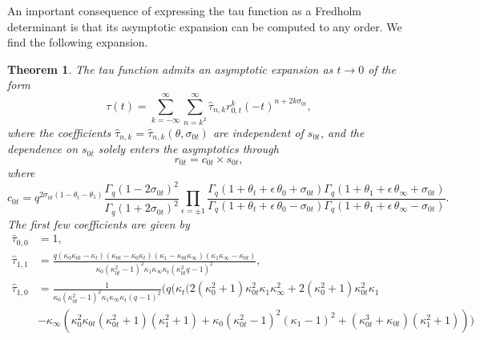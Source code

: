 \documentclass[a4paper,reqno,11pt]{amsart}
\numberwithin{equation}{section}
\numberwithin{figure}{section}
\theoremstyle{plain}
\newtheorem{theorem}{Theorem}[section]
\theoremstyle{remark}
\numberwithin{rhp}{section}
\begin{document}
An important consequence of expressing the tau function as a Fredholm determinant is that its asymptotic expansion can be computed to any order. We find the following expansion.
\begin{theorem}\label{thm:tau-asymp}
    The tau function admits an asymptotic expansion as $t\rightarrow 0$ of the form
\begin{equation}\label{eq:tau-asymp}
    \tau(t)=\sum_{k=-\infty}^\infty\sum_{n=k^2}^\infty \widehat{\tau}_{n,k} r_{0,t}^{k} (-t)^{n+ 2k \sigma_{0t}},
\end{equation}
where the coefficients $\widehat{\tau}_{n,k}=\widehat{\tau}_{n,k}(\theta,\sigma_{0t})$ are independent of $s_{0t}$, and the dependence on $s_{0t}$ solely enters the asymptotics through
\begin{equation}
    r_{0t}=c_{0t}\times s_{0t}, \label{rcs}
\end{equation}
where
\begin{equation}\label{eq:def_c0t}
c_{0t}=q^{2\sigma_{0t}(1-\theta_t-\theta_1)}\frac{\Gamma_q(1-2\sigma_{0t})^2}{\Gamma_q(1+2\sigma_{0t})^2}\prod_{\epsilon=\pm1}\frac{ \Gamma_q(1+\theta_t+\epsilon\,\theta_0+\sigma_{0t})  \Gamma_q(1+\theta_1+\epsilon\,\theta_\infty+\sigma_{0t})}{ \Gamma_q(1+\theta_t+\epsilon\,\theta_0-\sigma_{0t})  \Gamma_q(1+\theta_1+\epsilon\,\theta_\infty-\sigma_{0t})}.
\end{equation}
The first few coefficients are given by
 \begin{equation}\label{eq:tau-asymp-coeff}
 \begin{split}
 \widehat{\tau}_{0,0}&=1,\\
\widehat{\tau}_{1,1} &= \frac{q (\kappa_{0} \kappa_{0t}-\kappa_{t}) (\kappa_{0t}-\kappa_{0} \kappa_{t}) (\kappa_{1}-\kappa_{0t} \kappa_{\infty}) (\kappa_{1} \kappa_{\infty}-\kappa_{0t})}{\kappa_{0} \left(\kappa_{0t}^2-1\right)^2 \kappa_{1} \kappa_{\infty} \kappa_{t} \left(\kappa_{0t}^2 q-1\right)^2}, \\
       \widehat{\tau}_{1,0} &= \frac{1}{{\kappa_{0} \left(\kappa_{0t}^2-1\right)^2 \kappa_{1} \kappa_{\infty} \kappa_{t} (q-1)^2}}\Big(q \big(\kappa_{t} \big(2 \left(\kappa_{0}^2+1\right) \kappa_{0t}^2 \kappa_{1} \kappa_{\infty}^2+2 \left(\kappa_{0}^2+1\right) \kappa_{0t}^2 \kappa_{1}\\
        &-\kappa_{\infty} \left(\kappa_{0}^2 \kappa_{0t} \left(\kappa_{0t}^2+1\right) \left(\kappa_{1}^2+1\right)+\kappa_{0} \left(\kappa_{0t}^2-1\right)^2 (\kappa_{1}-1)^2+\left(\kappa_{0t}^3+\kappa_{0t}\right) \left(\kappa_{1}^2+1\right)\right)\big)\\

\end{split}
\end{equation}
\end{theorem}
\end{document}
